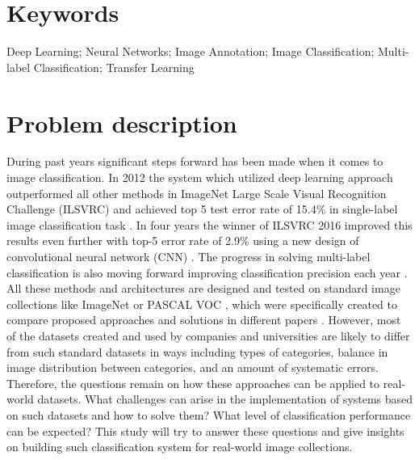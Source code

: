 \section{Keywords}
Deep Learning; Neural Networks; Image Annotation; Image Classification; Multi-label Classification; Transfer Learning

\section{Problem description}
During past years significant steps forward has been made when it comes to image classification. In 2012 the system which utilized deep learning approach outperformed all other methods in ImageNet Large Scale Visual Recognition Challenge (ILSVRC) and achieved top 5 test error rate of 15.4\% in single-label image classification task \cite{Krizhevsky2012ImageNetDNN, Russakovsky2015ImageNet, Schmidhuber2015DeepOverview}. In four years the winner of ILSVRC 2016 improved this results even further with top-5 error rate of 2.9\% using a new design of convolutional neural network (CNN) \cite{StanfordUniversity2016}. The progress in solving multi-label classification is also moving forward improving classification precision each year \cite{Wei2016HCP, Ren2016}. All these methods and architectures are designed and tested on standard image collections like ImageNet \cite{Russakovsky2015ImageNet} or PASCAL VOC \cite{Everingham2010PASCAL-VOC}, which were specifically created to compare proposed approaches and solutions in different papers \cite{Wei2016HCP, Oquab2014TransferringMidLevel, Gong2013DeepRanking, Chatfield2014ReturnDevilInTheDetails}. However, most of the datasets created and used by companies and universities are likely to differ from such standard datasets in ways including types of categories, balance in image distribution between categories, and an amount of systematic errors. Therefore, the questions remain on how these approaches can be applied to real-world datasets. What challenges can arise in the implementation of systems based on such datasets and how to solve them? What level of classification performance can be expected? This study will try to answer these questions and give insights on building such classification system for real-world image collections.


